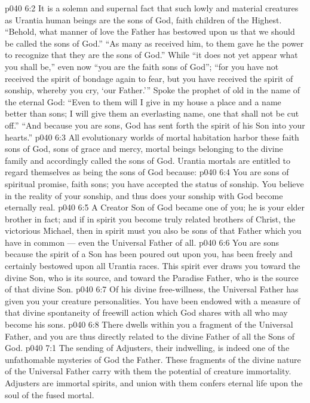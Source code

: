 \vs p040 6:2 It is a solemn and supernal fact that such lowly and material creatures as Urantia human beings are the sons of God, faith children of the Highest. “Behold, what manner of love the Father has bestowed upon us that we should be called the sons of God.” “As many as received him, to them gave he the power to recognize that they are the sons of God.” While “it does not yet appear what you shall be,” even now “you are the faith sons of God”; “for you have not received the spirit of bondage again to fear, but you have received the spirit of sonship, whereby you cry, ‘our Father.’” Spoke the prophet of old in the name of the eternal God: “Even to them will I give in my house a place and a name better than sons; I will give them an everlasting name, one that shall not be cut off.” “And because you are sons, God has sent forth the spirit of his Son into your hearts.”
\vs p040 6:3 All evolutionary worlds of mortal habitation harbor these faith sons of God, sons of grace and mercy, mortal beings belonging to the divine family and accordingly called the sons of God. Urantia mortals are entitled to regard themselves as being the sons of God because:
\vs p040 6:4 \bibnobreakspace You are sons of spiritual promise, faith sons; you have accepted the status of sonship. You believe in the reality of your sonship, and thus does your sonship with God become eternally real.
\vs p040 6:5 \pc {}\bibnobreakspace A Creator Son of God became one of you; he is your elder brother in fact; and if in spirit you become truly related brothers of Christ, the victorious Michael, then in spirit must you also be sons of that Father which you have in common --- even the Universal Father of all.
\vs p040 6:6 \pc {}\bibnobreakspace You are sons because the spirit of a Son has been poured out upon you, has been freely and certainly bestowed upon all Urantia races. This spirit ever draws you toward the divine Son, who is its source, and toward the Paradise Father, who is the source of that divine Son.
\vs p040 6:7 \pc {}\bibnobreakspace Of his divine free\hyp{}willness, the Universal Father has given you your creature personalities. You have been endowed with a measure of that divine spontaneity of freewill action which God shares with all who may become his sons.
\vs p040 6:8 \pc {}\bibnobreakspace There dwells within you a fragment of the Universal Father, and you are thus directly related to the divine Father of all the Sons of God.
\vs p040 7:1 The sending of Adjusters, their indwelling, is indeed one of the unfathomable mysteries of God the Father. These fragments of the divine nature of the Universal Father carry with them the potential of creature immortality. Adjusters are immortal spirits, and union with them confers eternal life upon the soul of the fused mortal.

